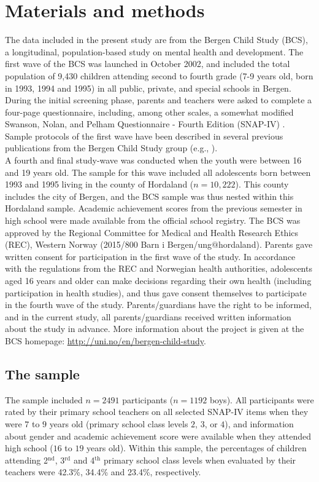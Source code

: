 \documentclass[10pt,letterpaper]{article}
\begin{document}
\section*{Materials and methods}
The data included in the present study are from the Bergen Child Study (BCS), a longitudinal, population-based study on mental health and development.
The first wave of the BCS was launched in October 2002, and included the total population of 9,430 children attending second to fourth grade (7-9 years old, born in 1993, 1994 and 1995) in all public, private, and special schools in Bergen. 
During the initial screening phase, parents and teachers were asked to complete a four-page questionnaire, including, among other scales, a somewhat modified Swanson, Nolan, and Pelham Questionnaire - Fourth Edition (SNAP-IV) \cite{Swanson1992}.
Sample protocols of the first wave have been described in several previous publications from the Bergen Child Study group 
(e.g., \cite{Heiervang2007, Lundervold2011, Sivertsen2015}).\\

A fourth and final study-wave was conducted when the youth were between 16 and 19 years old. The sample for this wave included all adolescents born between 1993 and 1995 living in the county of Hordaland ($n=10,222$). This county includes the city of Bergen, and the BCS sample was thus nested within this Hordaland sample. Academic achievement scores from the previous semester in high school were made available from the official school registry.  The BCS was approved by the Regional Committee for Medical and Health Research Ethics (REC), Western Norway (2015/800 Barn i Bergen/ung$@$hordaland). Parents gave written consent for participation in the first wave of the study. In accordance with the regulations from the REC and Norwegian health authorities, adolescents aged 16 years and older can make decisions regarding their own health (including participation in health studies), and thus gave consent themselves to participate in the fourth wave of the study. Parents/guardians have the right to be informed, and in the current study, all parents/guardians received written information about the study in advance.
More information about the project is given at the BCS homepage: {\small \url{http://uni.no/en/bergen-child-study}}.

\vspace{3mm}
\subsection*{The sample}
The sample included $n=2491$ participants ($n=1192$ boys). All participants were rated by their primary school teachers on all selected SNAP-IV items when they were $7$ to $9$ years old (primary school class levels $2$, $3$, or $4$), and information about gender and academic achievement score were available when they attended high school ($16$ to $19$ years old).
Within this sample, the percentages of children attending 2$^{\text{nd}}$, 3$^{\text{rd}}$ and 4$^{\text{th}}$ primary school
 class levels when evaluated by their teachers were 
42.3\%, 34.4\% and 23.4\%, respectively. 
\end{document}
